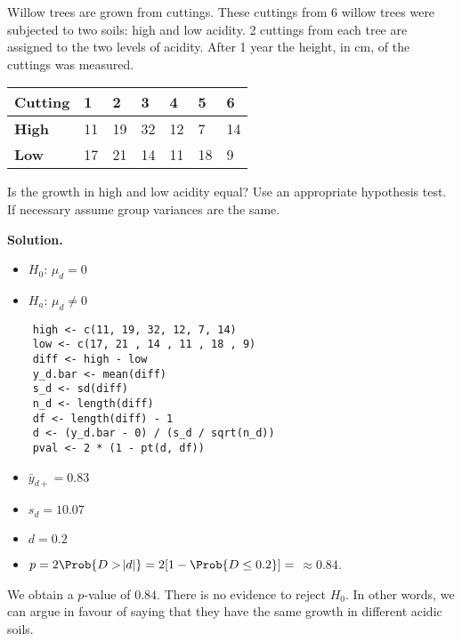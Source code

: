 \begin{Example}{}{}
    Willow trees are grown from cuttings. These cuttings from 6 willow trees were subjected to
    two soils: high and low acidity. 2 cuttings from each tree are assigned to the two levels of
    acidity. After 1 year the height, in cm, of the cuttings was measured.

    \begin{center}
        \begin{tabularx}{0.7\linewidth}{@{}YYYYYYY@{}}
            \textbf{Cutting} & 1  & 2  & 3  & 4  & 5  & 6  \\
            \midrule
            \textbf{High}    & 11 & 19 & 32 & 12 & 7  & 14 \\
            \textbf{Low}     & 17 & 21 & 14 & 11 & 18 & 9
        \end{tabularx}
    \end{center}

    Is the growth in high and low acidity equal? Use an appropriate hypothesis test. If necessary
    assume group variances are the same.

    \textbf{Solution.}
    \begin{itemize}
        \item $H_0$: $ \mu_d=0 $
        \item $H_a$: $ \mu_d\ne 0 $
    \end{itemize}
    \begin{verbatim}
    high <- c(11, 19, 32, 12, 7, 14)
    low <- c(17, 21 , 14 , 11 , 18 , 9)
    diff <- high - low
    y_d.bar <- mean(diff)
    s_d <- sd(diff)
    n_d <- length(diff)
    df <- length(diff) - 1
    d <- (y_d.bar - 0) / (s_d / sqrt(n_d))
    pval <- 2 * (1 - pt(d, df))
    \end{verbatim}
    \begin{itemize}
        \item $ \bar{y}_{d+}=0.83 $
        \item $ s_d=10.07 $
        \item $ d=0.2 $
        \item $ p=2\Prob{D>\abs{d}}=2[1-\Prob{D\le 0.2}]=$  $\approx
                  0.84$.
    \end{itemize}
    We obtain a $ p $-value of $ 0.84 $. There is no evidence to reject $ H_0 $.
    In other words, we can argue in favour of saying that they have the same
    growth in different acidic soils.
\end{Example}
